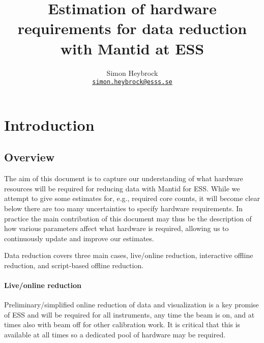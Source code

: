 \documentclass[a4paper,english,numbers=noenddot,bibliography=totoc,chapterprefix=on,DIV=12]{scrartcl}
\newcommand{\mantid}{Mantid\xspace}
\begin{document}
\title{Estimation of hardware requirements for data reduction with \mantid at ESS}
\author{Simon Heybrock\\
    {\small\href{mailto:simon.heybrock@esss.se}{\nolinkurl{simon.heybrock@esss.se}}}}

\maketitle

\tableofcontents

\section{Introduction}
\subsection{Overview}

The aim of this document is to capture our understanding of what hardware resources will be required for reducing data with \mantid for ESS.
While we attempt to give some estimates for, e.g., required core counts, it will become clear below there are too many uncertainties to specify hardware requirements.
In practice the main contribution of this document may thus be the description of how various parameters affect what hardware is required, allowing us to continuously update and improve our estimates.

Data reduction covers three main cases, live/online reduction, interactive offline reduction, and script-based offline reduction.

\paragraph{Live/online reduction}
Preliminary/simplified online reduction of data and visualization is a key promise of ESS and will be required for all instruments, any time the beam is on, and at times also with beam off for other calibration work.
It is critical that this is available at all times so a dedicated pool of hardware may be required.
\end{document}
